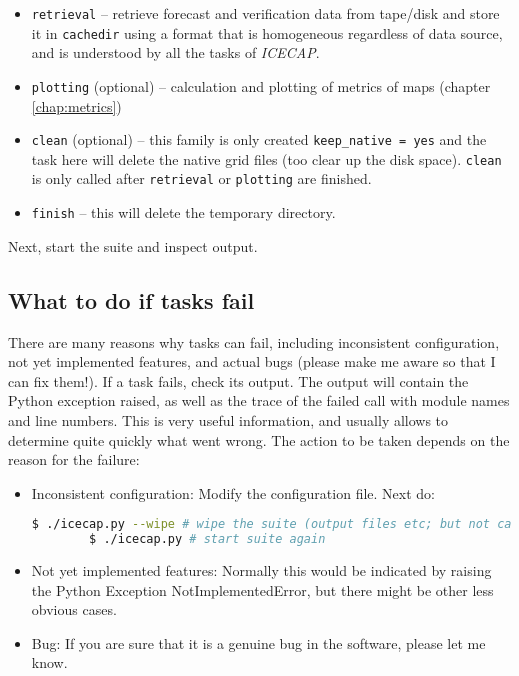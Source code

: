 \documentclass[DIV=10, parskip=full]{scrreprt}
\newcommand{\ice}{\textit{ICECAP}\xspace}
\begin{document}
\begin{itemize}
	\item \texttt{retrieval} -- retrieve forecast and verification data from tape/disk and store it in \texttt{cachedir} using a format that is homogeneous regardless of data source, and is understood by all the tasks of \ice. 
	\item \texttt{plotting} (optional) -- calculation and plotting of metrics of maps (chapter \ref{chap:metrics})
	\item \texttt{clean} (optional) -- this family is only created \texttt{keep\_native = yes} and the task here will delete the native grid files (too clear up the disk space). \texttt{clean} is only called after \texttt{retrieval} or \texttt{plotting} are finished. 
	\item \texttt{finish} -- this will delete the temporary directory.
\end{itemize}

Next, start the suite and inspect output. 

\subsection{What to do if tasks fail}
There are many reasons why tasks can fail, including inconsistent configuration, not yet implemented features, and actual bugs (please make me aware so that I can fix them!). If a task fails, check its output. The output will contain the Python exception raised, as well as the trace of the failed call with module names and line numbers. This is very useful information, and usually allows to determine quite quickly what went wrong. The action to be taken depends on the reason for the failure:\\

\begin{itemize}
	\item Inconsistent configuration: Modify the configuration file. Next do:
		\begin{lstlisting}[language=bash]
		$ ./icecap.py --wipe # wipe the suite (output files etc; but not cache)
		$ ./icecap.py # start suite again
	\end{lstlisting}
	\item Not yet implemented features: Normally this would be indicated by raising the Python Exception NotImplementedError, but there might be other less obvious cases.
	\item Bug: If you are sure that it is a genuine bug in the software, please let me know.
\end{itemize}
\end{document}
